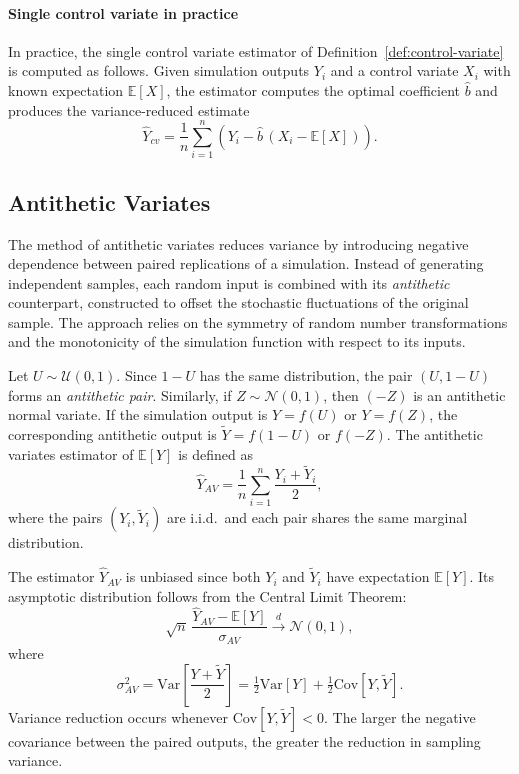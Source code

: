 \paragraph{Single control variate in practice}

In practice, the single control variate estimator of Definition~\ref{def:control-variate} is computed as follows.
Given simulation outputs \(Y_i\) and a control variate \(X_i\) with known expectation \(\mathbb{E}[X]\), the estimator computes the optimal coefficient 
\(\hat{b}\) and produces the variance-reduced estimate
\[
\hat{Y}_{cv} = \frac{1}{n}\sum_{i=1}^n \left( Y_i - \hat{b}\,\left( X_i - \mathbb{E}[X] \right) \right).
\]

\subsection{Antithetic Variates} 

The method of antithetic variates reduces variance by introducing negative dependence between paired replications of a simulation. Instead of generating independent samples, each random input is combined with its \emph{antithetic} counterpart, constructed to offset the stochastic fluctuations of the original sample. The approach relies on the symmetry of random number transformations and the monotonicity of the simulation function with respect to its inputs.

\begin{definition}
Let \(U \sim \mathcal{U}(0,1)\). Since \(1-U\) has the same distribution, the pair \((U,1-U)\) forms an \emph{antithetic pair}.  
Similarly, if \(Z \sim \mathcal{N}(0,1)\), then \((-Z)\) is an antithetic normal variate.  
If the simulation output is \(Y = f(U)\) or \(Y = f(Z)\), the corresponding antithetic output is \(\widetilde{Y} = f(1-U)\) or \(f(-Z)\).  
The antithetic variates estimator of \(\mathbb{E}[Y]\) is defined as
\[
\widehat{Y}_{AV} = \frac{1}{n}\sum_{i=1}^{n} \frac{Y_i + \widetilde{Y}_i}{2},
\]
where the pairs \((Y_i,\widetilde{Y}_i)\) are i.i.d.\ and each pair shares the same marginal distribution.
\end{definition}

\begin{remark}
The estimator \(\widehat{Y}_{AV}\) is unbiased since both \(Y_i\) and \(\widetilde{Y}_i\) have expectation \(\mathbb{E}[Y]\).  
Its asymptotic distribution follows from the Central Limit Theorem:
\[
\sqrt{n}\,\frac{\widehat{Y}_{AV}-\mathbb{E}[Y]}{\sigma_{AV}} \xrightarrow{d} \mathcal{N}(0,1),
\]
where
\[
\sigma_{AV}^2 = \mathrm{Var}\!\left[\frac{Y + \widetilde{Y}}{2}\right]
= \tfrac{1}{2}\mathrm{Var}[Y] + \tfrac{1}{2}\mathrm{Cov}[Y,\widetilde{Y}].
\]
Variance reduction occurs whenever \(\mathrm{Cov}[Y,\widetilde{Y}] < 0\). The larger the negative covariance between the paired outputs, the greater the reduction in sampling variance.
\end{remark}

